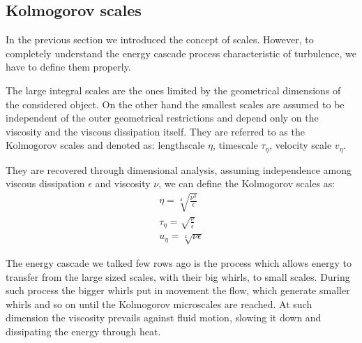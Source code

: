 \subsection{Kolmogorov scales}
In the previous section we introduced the concept of scales. However, to completely understand the energy cascade process characteristic of turbulence, we have to define them properly.
\par
The large integral scales are the ones limited by the geometrical dimensions of the considered object. On the other hand the smallest scales are assumed to be independent of the outer geometrical restrictions and depend only on the viscosity and the viscous dissipation itself. They are referred to as the Kolmogorov scales and denoted as: lengthscale $\eta$, timescale $\tau_{\eta}$, velocity scale $v_{\eta}$. 
\par
They are recovered through dimensional analysis, assuming independence among viscous dissipation $\epsilon$ and viscosity $\nu$, we can define the Kolmogorov scales as:
\begin{subequations}
\begin{align}
\eta = \sqrt[4]{ \frac{\nu^{3}}{\epsilon} }\\
\tau_{\eta} =\sqrt{ \frac{\nu}{\epsilon}}\\
u_{\eta} = \sqrt[4]{\nu \epsilon }
\end{align}
\end{subequations}

The energy cascade we talked few rows ago is the process which allows energy to transfer from the large sized scales, with their big whirls, to small scales. During such process the bigger whirls put in movement the flow, which generate smaller whirls and so on until the Kolmogorov microscales are reached. At such dimension the viscosity prevails against fluid motion, slowing it down and dissipating the energy through heat.
  
  


